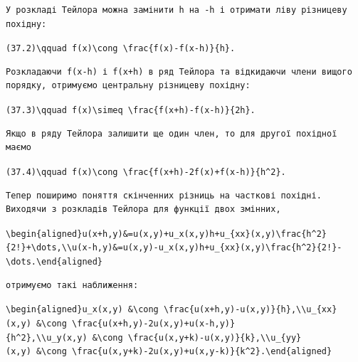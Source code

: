 \documentclass[
  ukrainian,
]{article}
\begin{document}
\begin{verbatim}
У розкладі Тейлора можна замінити h на -h і отримати ліву різницеву похідну:
\end{verbatim}

\texttt{(37.2)\textbackslash{}qquad\ f\textquotesingle{}(x)\textbackslash{}cong\ \textbackslash{}frac\{f(x)-f(x-h)\}\{h\}.}

\begin{verbatim}
Розкладаючи f(x-h) і f(x+h) в ряд Тейлора та відкидаючи члени вищого порядку, отримуємо центральну різницеву похідну:
\end{verbatim}

\texttt{(37.3)\textbackslash{}qquad\ f\textquotesingle{}(x)\textbackslash{}simeq\ \textbackslash{}frac\{f(x+h)-f(x-h)\}\{2h\}.}

\begin{verbatim}
Якщо в ряду Тейлора залишити ще один член, то для другої похідної маємо
\end{verbatim}

\texttt{(37.4)\textbackslash{}qquad\ f\textquotesingle{}\textquotesingle{}(x)\textbackslash{}cong\ \textbackslash{}frac\{f(x+h)-2f(x)+f(x-h)\}\{h\^{}2\}.}

\begin{verbatim}
Тепер поширимо поняття скінченних різниць на часткові похідні. Виходячи з розкладів Тейлора для функції двох змінних,
\end{verbatim}

\texttt{\textbackslash{}begin\{aligned\}u(x+h,y)\&=u(x,y)+u\_x(x,y)h+u\_\{xx\}(x,y)\textbackslash{}frac\{h\^{}2\}\{2!\}+\textbackslash{}dots,\textbackslash{}\textbackslash{}u(x-h,y)\&=u(x,y)-u\_x(x,y)h+u\_\{xx\}(x,y)\textbackslash{}frac\{h\^{}2\}\{2!\}-\textbackslash{}dots.\textbackslash{}end\{aligned\}}

\begin{verbatim}
отримуємо такі наближення:
\end{verbatim}

\texttt{\textbackslash{}begin\{aligned\}u\_x(x,y)\ \&\textbackslash{}cong\ \textbackslash{}frac\{u(x+h,y)-u(x,y)\}\{h\},\textbackslash{}\textbackslash{}u\_\{xx\}(x,y)\ \&\textbackslash{}cong\ \textbackslash{}frac\{u(x+h,y)-2u(x,y)+u(x-h,y)\}\{h\^{}2\},\textbackslash{}\textbackslash{}u\_y(x,y)\ \&\textbackslash{}cong\ \textbackslash{}frac\{u(x,y+k)-u(x,y)\}\{k\},\textbackslash{}\textbackslash{}u\_\{yy\}(x,y)\ \&\textbackslash{}cong\ \textbackslash{}frac\{u(x,y+k)-2u(x,y)+u(x,y-k)\}\{k\^{}2\}.\textbackslash{}end\{aligned\}}
\end{document}

